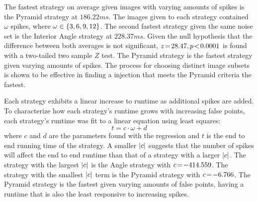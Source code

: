 %
%
%
%
The fastest strategy on average given images with varying amounts of spikes is the Pyramid strategy at $186.22\si{ms}$.
The images given to each strategy contained $\omega$ spikes, where $\omega \in \left\{  3, 6, 9, 12  \right\}$.
The second fastest strategy given the same noise set is the Interior Angle strategy at $228.37\si{ms}$.
Given the null hypothesis that the difference between both averages is not significant, $z \!=\! 28.47, p\!<\!0.0001$ is
found with a two-tailed two sample $Z$ test.
The Pyramid strategy is the fastest strategy given varying amounts of spikes.
The process for choosing distinct image subsets is shown to be effective in finding a injection that meets the Pyramid
criteria the fastest.

%
%
%
Each strategy exhibits a linear increase to runtime as additional spikes are added.
To characterize how each strategy's runtime grows with increasing false points, each strategy's runtime was fit
to a linear equation using least squares:
\begin{equation}
    t = c\cdot\omega + d
\end{equation}
where $c$ and $d$ are the parameters found with the regression and $t$ is the end to end running time of the strategy.
A smaller $\left| c \right|$ suggests that the number of spikes will affect the end to end runtime than that of a strategy with a
larger $\left| c \right|$.
The strategy with the largest $\left| c \right|$ is the Angle strategy with $c \!=\! -414.559$.
The strategy with the smallest $\left| c \right|$ term is the Pyramid strategy with $c \!=\! -6.766$.
The Pyramid strategy is the fastest given varying amounts of false points, having a runtime that is also the least
responsive to increasing spikes.

